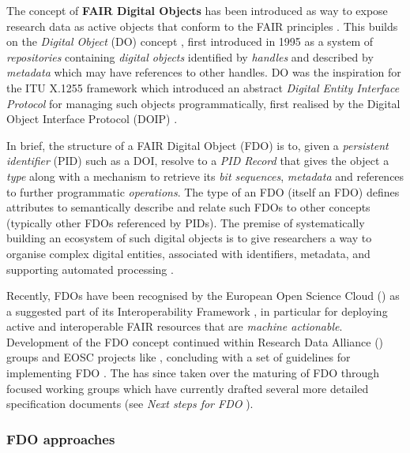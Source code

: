 The concept of \textbf{FAIR Digital Objects} \cite{schultesFAIRPrinciplesDigital2019a} has been introduced as way to expose research data as active objects that conform to the FAIR principles \cite{Wilkinson 2016}. This builds on the \emph{Digital Object} (DO) concept \cite{kahnFrameworkDistributedDigital2006b}, first introduced in 1995 \cite{kahnFrameworkDistributedDigital1995a} as a system of \emph{repositories} containing \emph{digital objects} identified by \emph{handles} and described by \emph{metadata} which may have references to other handles. DO was the inspiration for the ITU X.1255 framework \cite{x1255FrameworkDiscovery} which introduced an abstract \emph{Digital Entity Interface Protocol} for managing such objects programmatically, first realised by the Digital Object Interface Protocol (DOIP) \cite{DigitalObjectInterface}.

In brief, the structure of a FAIR Digital Object (FDO) is to, given a \emph{persistent identifier} (PID) such as a DOI, resolve to a \emph{PID Record} that gives the object a \emph{type} along with a mechanism to retrieve its \emph{bit sequences}, \emph{metadata} and references to further programmatic \emph{operations}. The type of an FDO (itself an FDO) defines attributes to semantically describe and relate such FDOs to other concepts (typically other FDOs referenced by PIDs). The premise of systematically building an ecosystem of such digital objects is to give researchers a way to organise complex digital entities, associated with identifiers, metadata, and supporting automated processing \cite{wittenburgDigitalObjectsDrivers2019a}.

Recently, FDOs have been recognised by the European Open Science Cloud () as a suggested part of its Interoperability Framework \cite{eosc-interop-framework}, in particular for deploying active and interoperable FAIR resources that are \emph{machine actionable}. Development of the FDO concept continued within Research Data Alliance () groups and EOSC projects like , concluding with a set of guidelines for implementing FDO \cite{bonino2019}. The  has since taken over the maturing of FDO through focused working groups which have currently drafted several more detailed specification documents (see \emph{Next steps for FDO} ).

\subsubsection{FDO approaches}\label{ch3:fdo-approaches}

